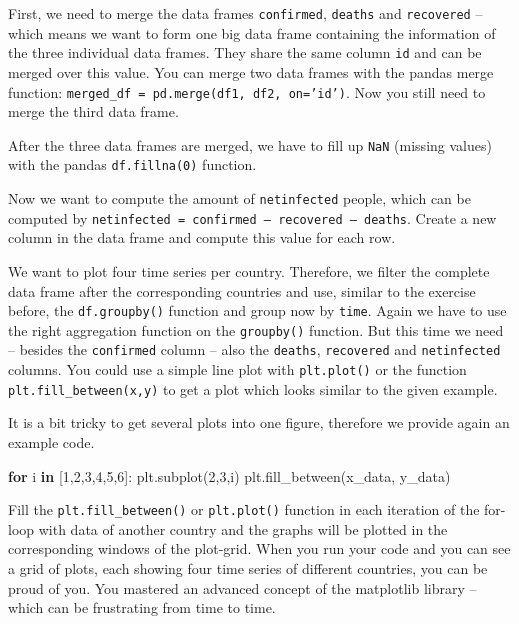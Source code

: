 \documentclass[
  11pt,
]{article}
\newenvironment{Shaded}{\begin{snugshade}}{\end{snugshade}}
\newcommand{\ControlFlowTok}[1]{\textcolor[rgb]{0.13,0.29,0.53}{\textbf{#1}}}
\newcommand{\DecValTok}[1]{\textcolor[rgb]{0.00,0.00,0.81}{#1}}
\newcommand{\KeywordTok}[1]{\textcolor[rgb]{0.13,0.29,0.53}{\textbf{#1}}}
\newcommand{\NormalTok}[1]{#1}
\newenvironment{tipsp}[1]
  {
  \begin{itemize}
  \footnotesize
  \renewcommand{\labelitemi}{
    \raisebox{-.7\height}[0pt][0pt]{
      {\setkeys{Gin}{width=3em,keepaspectratio}
        \texttt{[image: images/\#1.png]}}
    }
  }
  \setlength{\fboxsep}{1em}
  \begin{pbox}
  \item
  }
  {
  \end{pbox}
  \end{itemize}
  }
\begin{document}
\begin{tipsp}p

First, we need to merge the data frames \texttt{confirmed}, \texttt{deaths} and \texttt{recovered} -- which means we want to form one big data frame containing the information of the three individual data frames. They share the same column \texttt{id} and can be merged over this value. You can merge two data frames with the pandas merge function: \texttt{merged\_df\ =\ pd.merge(df1,\ df2,\ on=’id’)}. Now you still need to merge the third data frame.

After the three data frames are merged, we have to fill up \texttt{NaN} (missing values) with the pandas \texttt{df.fillna(0)} function.

Now we want to compute the amount of \texttt{netinfected} people, which can be computed by \texttt{netinfected\ =\ confirmed\ –\ recovered\ –\ deaths}. Create a new column in the data frame and compute this value for each row.

We want to plot four time series per country. Therefore, we filter the complete data frame after the corresponding countries and use, similar to the exercise before, the \texttt{df.groupby()} function and group now by \texttt{time}. Again we have to use the right aggregation function on the \texttt{groupby()} function. But this time we need -- besides the \texttt{confirmed} column -- also the \texttt{deaths}, \texttt{recovered} and \texttt{netinfected} columns. You could use a simple line plot with \texttt{plt.plot()} or the function \texttt{plt.fill\_between(x,y)} to get a plot which looks similar to the given example.

It is a bit tricky to get several plots into one figure, therefore we provide again an example code.

\begin{Shaded}
\begin{Highlighting}[]
\ControlFlowTok{for}\NormalTok{ i }\KeywordTok{in}\NormalTok{ [}\DecValTok{1}\NormalTok{,}\DecValTok{2}\NormalTok{,}\DecValTok{3}\NormalTok{,}\DecValTok{4}\NormalTok{,}\DecValTok{5}\NormalTok{,}\DecValTok{6}\NormalTok{]:}
\NormalTok{    plt.subplot(}\DecValTok{2}\NormalTok{,}\DecValTok{3}\NormalTok{,i)}
\NormalTok{    plt.fill\_between(x\_data, y\_data)}
\end{Highlighting}
\end{Shaded}

Fill the \texttt{plt.fill\_between()} or \texttt{plt.plot()} function in each iteration of the for-loop with data of another country and the graphs will be plotted in the corresponding windows of the plot-grid.
When you run your code and you can see a grid of plots, each showing four time series of different countries, you can be proud of you. You mastered an advanced concept of the matplotlib library -- which can be frustrating from time to time.


\end{tipsp}
\end{document}
